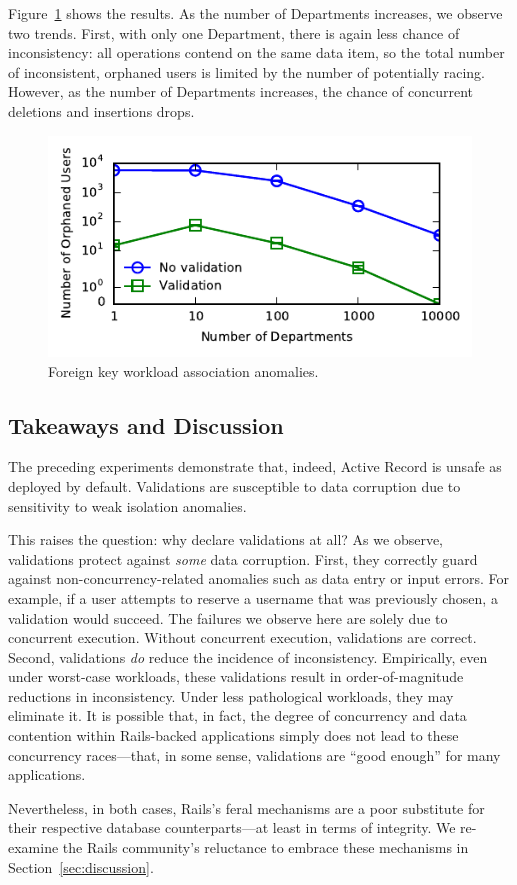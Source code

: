 Figure~\ref{fig:fk-workload} shows the results. As the number of
Departments increases, we observe two trends. First, with only one
Department, there is again less chance of inconsistency: all
operations contend on the same data item, so the total number of
inconsistent, orphaned users is limited by the number of potentially
racing. However, as the number of Departments increases, the chance of
concurrent deletions and insertions drops.

\begin{figure}
\includegraphics[width=\columnwidth]{figs/fk-workload-violations.pdf}\vspace{-1em}
\caption{Foreign key workload association anomalies.}
\label{fig:fk-workload}
\end{figure}

\subsection{Takeaways and Discussion}

The preceding experiments demonstrate that, indeed, Active Record is
unsafe as deployed by default. Validations are susceptible to data
corruption due to sensitivity to weak isolation anomalies.

This raises the question: why declare validations at all? As we
observe, validations protect against \textit{some} data
corruption. First, they correctly guard against
non-concurrency-related anomalies such as data entry or input
errors. For example, if a user attempts to reserve a username that was
previously chosen, a validation would succeed. The failures we observe
here are solely due to concurrent execution. Without concurrent
execution, validations are correct. Second, validations \textit{do}
reduce the incidence of inconsistency. Empirically, even under
worst-case workloads, these validations result in order-of-magnitude
reductions in inconsistency. Under less pathological workloads, they
may eliminate it. It is possible that, in fact, the
degree of concurrency and data contention within Rails-backed
applications simply does not lead to these concurrency races---that,
in some sense, validations are ``good enough'' for many applications.

Nevertheless, in both cases, Rails's feral mechanisms are a poor
substitute for their respective database counterparts---at least in
terms of integrity. We re-examine the Rails community's reluctance to
embrace these mechanisms in Section~\ref{sec:discussion}.

